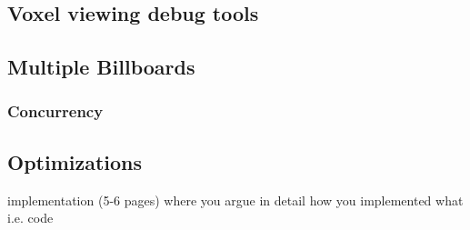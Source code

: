 \subsection{Voxel viewing debug tools}
\subsection{Multiple Billboards}
\subsubsection{Concurrency}
\subsection{Optimizations}

implementation (5-6 pages) where you argue in detail how you implemented what i.e. code
